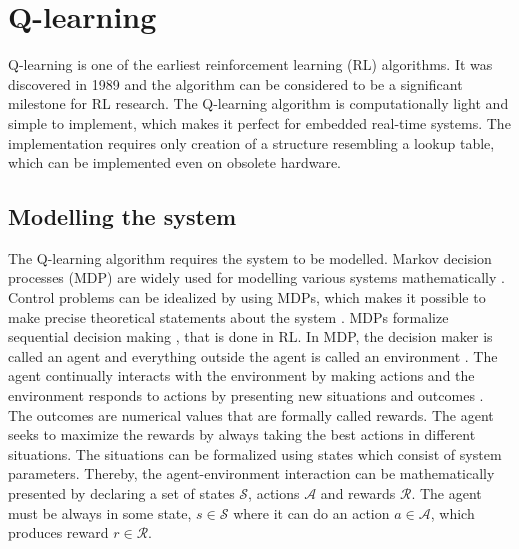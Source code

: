 \section{Q-learning}
Q-learning is one of the earliest reinforcement learning (RL) algorithms. It was discovered in 1989 \cite{RL:Watkins-Q} and the algorithm can be considered to be a significant milestone for RL research. The Q-learning algorithm is computationally light and simple to implement, which makes it perfect for embedded real-time systems. The implementation requires only creation of a structure resembling a lookup table, which can be implemented even on obsolete hardware.


\subsection{Modelling the system}
The Q-learning algorithm requires the system to be modelled. Markov decision processes (MDP) are widely used for modelling various systems mathematically \cite{RL:Single-step, RL:Sutton-Barto}. Control problems can be idealized by using MDPs, which makes it possible to make precise theoretical statements about the system \cite{RL:Sutton-Barto}. MDPs formalize sequential decision making \cite{RL:Sutton-Barto}, that is done in RL. In MDP, the decision maker is called an agent and everything outside the agent is called an environment \cite{RL:Sutton-Barto}. The agent continually interacts with the environment by making actions and the environment responds to actions by presenting new situations and outcomes \cite{RL:Sutton-Barto}. The outcomes are numerical values that are formally called rewards. The agent seeks to maximize the rewards by always taking the best actions in different situations. The situations can be formalized using states which consist of system parameters. Thereby, the agent-environment interaction can be mathematically presented by declaring a set of states $\mathcal{S}$, actions $\mathcal{A}$ and rewards $\mathcal{R}$. The agent must be always in some state, $s \in \mathcal{S}$ where it can do an action $a \in \mathcal{A}$, which produces reward $r \in \mathcal{R}$.

